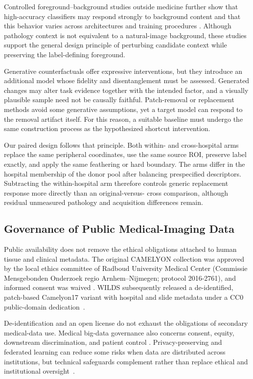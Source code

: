 \documentclass[notspecified,article,submit,moreauthors]{Definitions/mdpi}
\begin{document}
Controlled foreground--background studies outside medicine further show that
high-accuracy classifiers may respond strongly to background content and that
this behavior varies across architectures and training procedures
\cite{xiao2021backgrounds,moayeri2022sensitivity}. Although pathology context
is not equivalent to a natural-image background, these studies support the
general design principle of perturbing candidate context while preserving the
label-defining foreground.

Generative counterfactuals offer expressive interventions, but they introduce
an additional model whose fidelity and disentanglement must be assessed.
Generated changes may alter task evidence together with the intended factor,
and a visually plausible sample need not be causally faithful. Patch-removal
or replacement methods avoid some generative assumptions, yet a target model
can respond to the removal artifact itself. For this reason, a suitable
baseline must undergo the same construction process as the hypothesized
shortcut intervention.

Our paired design follows that principle. Both within- and cross-hospital
arms replace the same peripheral coordinates, use the same source ROI,
preserve label exactly, and apply the same feathering or hard boundary. The
arms differ in the hospital membership of the donor pool after balancing
prespecified descriptors. Subtracting the within-hospital arm therefore
controls generic replacement response more directly than an original-versus-
cross comparison, although residual unmeasured pathology and acquisition
differences remain.

\subsection{Governance of Public Medical-Imaging Data}
\label{subsec:ethics_related}

Public availability does not remove the ethical obligations attached to
human tissue and clinical metadata. The original CAMELYON collection was
approved by the local ethics committee of Radboud University Medical Center
(Commissie Mensgebonden Onderzoek regio Arnhem--Nijmegen; protocol
2016-2761), and informed consent was waived
\cite{litjens2018camelyon}. WILDS subsequently released a de-identified,
patch-based Camelyon17 variant with hospital and slide metadata under a CC0
public-domain dedication~\cite{koh2021wilds}.

De-identification and an open license do not exhaust the obligations of
secondary medical-data use. Medical big-data governance also concerns consent,
equity, downstream discrimination, and patient control
\cite{price2019privacy,vayena2018ethics}. Privacy-preserving and federated
learning can reduce some risks when data are distributed across institutions,
but technical safeguards complement rather than replace ethical and
institutional oversight~\cite{kaissis2020privacy}.
\end{document}

